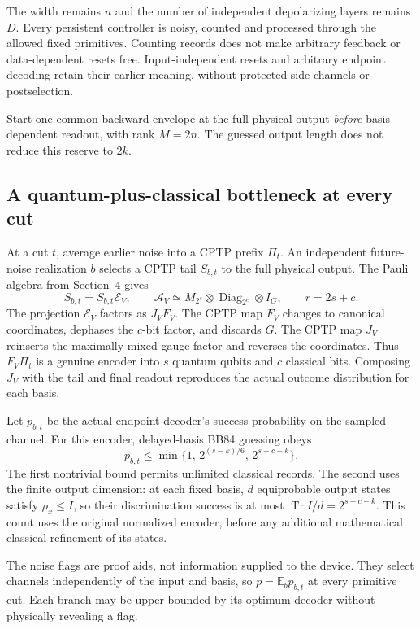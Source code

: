 \documentclass[11pt,a4paper]{article}
\numberwithin{equation}{section}
\theoremstyle{remark}\newtheorem*{remark}{Interpretation}
\newcommand{\Tr}{\operatorname{Tr}}
\newcommand{\E}{\mathbb E}
\newcommand{\A}{\mathcal A}
\begin{document}
The width remains $n$ and the number of independent depolarizing layers remains $D$. Every persistent controller is noisy, counted and processed through the allowed fixed primitives. Counting records does not make arbitrary feedback or data-dependent resets free. Input-independent resets and arbitrary endpoint decoding retain their earlier meaning, without protected side channels or postselection.

Start one common backward envelope at the full physical output \emph{before} basis-dependent readout, with rank $M=2n$. The guessed output length does not reduce this reserve to $2k$.

\subsection{A quantum-plus-classical bottleneck at every cut}
At a cut $t$, average earlier noise into a CPTP prefix $\Pi_t$. An independent future-noise realization $b$ selects a CPTP tail $S_{b,t}$ to the full physical output. The Pauli algebra from Section~4 gives
\[
S_{b,t}=S_{b,t}\mathcal E_V,\qquad
\A_V\simeq M_{2^s}\otimes\operatorname{Diag}_{2^c}\otimes I_G,
\qquad r=2s+c.
\]
The projection $\mathcal E_V$ factors as $J_VF_V$. The CPTP map $F_V$ changes to canonical coordinates, dephases the $c$-bit factor, and discards $G$. The CPTP map $J_V$ reinserts the maximally mixed gauge factor and reverses the coordinates. Thus $F_V\Pi_t$ is a genuine encoder into $s$ quantum qubits and $c$ classical bits. Composing $J_V$ with the tail and final readout reproduces the actual outcome distribution for each basis.

Let $p_{b,t}$ be the actual endpoint decoder's success probability on the sampled channel. For this encoder, delayed-basis BB84 guessing obeys
\begin{equation}
p_{b,t}\le\min\{1,\,2^{(s-k)/6},\,2^{s+c-k}\}.
\label{eq:guess-branch}
\end{equation}
The first nontrivial bound permits unlimited classical records. The second uses the finite output dimension: at each fixed basis, $d$ equiprobable output states satisfy $\rho_x\le I$, so their discrimination success is at most $\Tr I/d=2^{s+c-k}$. This count uses the original normalized encoder, before any additional mathematical classical refinement of its states.

The noise flags are proof aids, not information supplied to the device. They select channels independently of the input and basis, so $p=\E_b p_{b,t}$ at every primitive cut. Each branch may be upper-bounded by its optimum decoder without physically revealing a flag.
\end{document}
